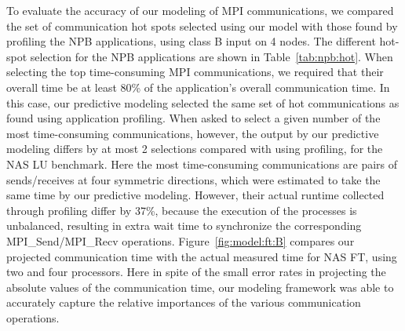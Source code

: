 To evaluate the accuracy of our modeling of MPI communications,
  we compared the set of communication hot spots selected using our model with those found by profiling
  the NPB applications, using class B input on 4 nodes.
The different hot-spot selection for the NPB applications are shown in Table~\ref{tab:npb:hot}.
When selecting the top time-consuming MPI communications, we required that their overall time be at least 80\% of the application's overall communication time.
In this case, our predictive modeling selected the same set of hot communications as found using application profiling.
When asked to select a given number of the most time-consuming communications, however, the output by our predictive modeling differs by at most 2 selections compared with using profiling,
for the NAS LU benchmark.
Here the most time-consuming communications are pairs of sends/receives at four symmetric directions, which were estimated to take the same time by our predictive modeling.
However, their actual runtime collected through profiling differ by 37\%, because the execution of the processes is unbalanced, resulting in extra wait time to synchronize the corresponding MPI\_Send/MPI\_Recv operations.
Figure~\ref{fig:model:ft:B} compares our projected communication time with the actual measured time for NAS FT, using two and four processors.  Here in spite of the small error rates in projecting the absolute values of the communication time, our modeling framework was able to accurately capture the relative importances of the various communication operations.



